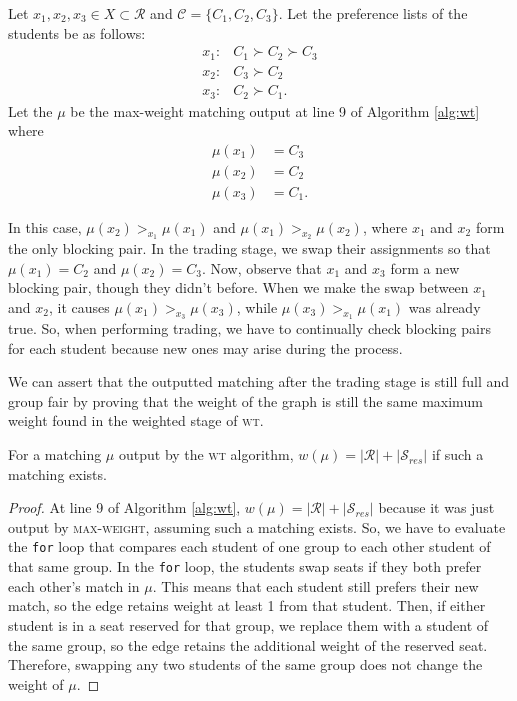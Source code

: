 \begin{example} \label{eg:trading}
  Let $x_1, x_2, x_3 \in X \subset \mathcal{R}$ and $\mathcal{C} = \{C_1, C_2, C_3\}$.
  Let the preference lists of the students be as follows: \[
    \begin{array}{ll} x_1: & C_1 \succ C_2 \succ C_3 \\ x_2: &
             C_3 \succ C_2             \\ x_3: & C_2 \succ C_1.    \end{array}
  \]
  Let the $\mu$ be the max-weight matching output at line 9 of Algorithm
  \ref{alg:wt} where  \[
    \begin{array}{ll} \mu(x_1) &= C_3 \\ \mu(x_2) &= C_2\\ \mu(x_3) &= C_1.    \end{array}
  \]

  In this case,  $\mu(x_2) >_{x_1} \mu(x_1)$ and $\mu(x_1) >_{x_2} \mu(x_2)$,
  where $x_1$ and $x_2$ form the only blocking pair. In the trading stage, we swap their
  assignments so that $\mu(x_1) = C_2$ and $\mu(x_2) = C_3$. Now, observe that
  $x_1$ and $x_3$ form a new blocking pair, though they didn't before. When we make
  the swap between $x_1$ and $x_2$, it causes $\mu(x_1) >_{x_3} \mu(x_3)$,
  while $\mu(x_3) >_{x_1} \mu(x_1)$ was already true. So, when performing
  trading, we have to continually check blocking pairs for each student because
  new ones may arise during the process. 
\end{example}

We can assert that the outputted matching after the trading stage is still full and group
fair by proving that the weight of the graph is still the same maximum weight found
in the weighted stage of \textsc{wt}.

\begin{theorem}
  \label{thm:same_weights}
  For a matching $\mu$ output by the \textsc{wt} algorithm, $w(\mu) =
  |\mathcal{R}| + |\mathcal{S}_{res}|$ if such a matching exists.
\end{theorem}

\begin{proof}
  At line 9 of Algorithm \ref{alg:wt}, $w(\mu) = |\mathcal{R}| + |\mathcal{S}_{res}|$
  because it was just output by \textsc{max-weight}, assuming such a
  matching exists. So, we have to
  evaluate the \texttt{for} loop that compares each student of one group to each other
  student of that same group. In the \texttt{for} loop, the students swap seats if they
  both prefer each other's match in $\mu$. This means that each student still
  prefers their new match, so the edge retains weight at least 1
  from that student. Then, if either student is in a seat reserved for that
  group, we replace them with a student of the same group, so the edge retains the
  additional weight of the reserved seat. Therefore, swapping any two students of
  the same group does not change the weight of $\mu$.
\end{proof}

